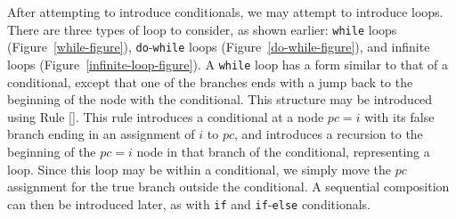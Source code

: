 After attempting to introduce conditionals, we may attempt to
introduce loops.
There are three types of loop to consider, as shown earlier:
\texttt{while} loops (Figure~\ref{while-figure}),
\texttt{do}-\texttt{while} loops (Figure~\ref{do-while-figure}), and
infinite loops (Figure~\ref{infinite-loop-figure}).
A \texttt{while} loop has a form similar to that of a conditional,
except that one of the branches ends with a jump back to the beginning
of the node with the conditional.
This structure may be introduced using
Rule [].
This rule introduces a conditional at a node $pc=i$ with its false
branch ending in an assignment of $i$ to $pc$, and introduces a
recursion to the beginning of the $pc=i$ node in that branch of the
conditional, representing a loop.
Since this loop may be within a conditional, we simply move the $pc$
assignment for the true branch outside the conditional.
A sequential composition can then be introduced later, as with
\texttt{if} and \texttt{if}-\texttt{else} conditionals.
